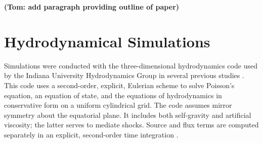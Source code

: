 \documentclass[manuscript]{aastex} %
\begin{document}
{\bf (Tom: add paragraph providing outline of paper)}



\section{Hydrodynamical Simulations}

Simulations were conducted with the three-dimensional hydrodynamics code used by the Indiana University Hydrodynamics Group in several previous studies \citep{pickett1998, pickett2000, mejiaphd2004, mejia2005, boley2006, cai2008}.  This code uses a second-order, explicit, Eulerian scheme to solve Poisson's equation, an equation of state, and the equations of hydrodynamics in conservative form on a uniform cylindrical grid.  The code assumes mirror symmetry about the equatorial plane. It includes both self-gravity and artificial viscosity; the latter serves to 
mediate shocks. Source and flux terms \citep{norman1986} are computed separately in an explicit, second-order time integration \citep{albada1982,christodoulou1991,yangphd1992}.
\end{document}
